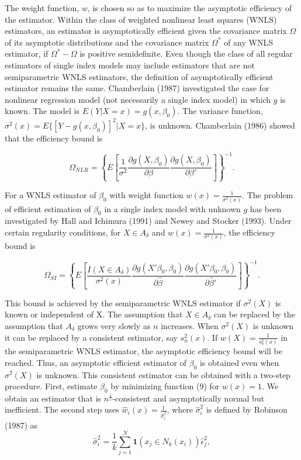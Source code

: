 \documentclass[a4paper]{article}
\begin{document}
The weight function, $w$, is chosen so as to maximize the asymptotic efficiency of the estimator. Within the class of weighted nonlinear least squares (WNLS) estimators, an estimator is asymptotically efficient given the covariance matrix $\Omega$ of its asymptotic distributions and the covariance matrix $\Omega^*$ of any WNLS estimator, if $\Omega^* - \Omega$ is positive semidefinite. Even though the class of all regular estimators of single index models may include estimators that are not semiparametric WNLS estimators, the definition of asymptotically efficient estimator remains the same. Chamberlain (1987) investigated the case for nonlinear regression model (not necessarily a single index model) in which $g$ is known. The model is $E(Y|X = x) = g(x, \beta_0)$. The variance function, $\sigma^2(x) = E\{[Y - g(x, \beta_0)]^2| X = x\}$, is unknown. Chamberlain (1986) showed that the efficiency bound is 

\[ \Omega_{NLR} = \left\{E\left[\frac{1}{\sigma^2}\frac{\partial g(X, \beta_0)}{\partial \beta} \frac{\partial g(X, \beta_0)}{\partial \beta'}\right]\right\}^{-1}. \]

For a WNLS estimator of $\beta_0$ with weight function $w(x) = \frac{1}{\sigma^2(x)}$. The problem of efficient estimation of $\beta_0$ in a single index model with unknown $g$ has been investigated by Hall and Ichimura (1991) and Newey and Stocker (1993). Under certain regularity conditions, for $X \in A_{\delta}$ and $w(x) = \frac{1}{\sigma^2(x)}$, the efficiency bound is

\begin{equation}
\Omega_{SI} = \left\{ E\left[\frac{I(X \in A_{\delta})}{\sigma^2(x)}\frac{\partial g(X'\beta_0, \beta_0)}{\partial \hat{\beta}}\frac{\partial g(X'\beta_0, \beta_0)}{\partial \hat{\beta}'}\right] \right\}^{-1}.
\end{equation}

This bound is achieved by the semiparametric WNLS estimator if $\sigma^2(X)$ is known or independent of X. The assumption that $X \in A_{\delta}$ can be replaced by the assumption that $A_{\delta}$ grows very slowly as $n$ increases. When $\sigma^2(X)$ is unknown it can be replaced by a consistent estimator, say $s_{n}^{2}(x)$. If $w(X) = \frac{1}{s_{n}^{2}(x)}$ in the semiparametric WNLS estimator, the asymptotic efficiency bound will be reached. Thus, an asymptotic efficient estimator of $\beta_0$ is obtained even when $\sigma^2(X)$ is unknown. This consistent estimator can be obtained with a two-step procedure. First, estimate $\beta_0$ by minimizing function (9) for $w(x) = 1$. We obtain an estimator that is $n^{\frac{1}{2}}$-consistent and asymptotically normal but inefficient. The second step uses $\hat{w}_i(x) = \frac{1}{\hat{\sigma}_{i}^{2}}$, where  $\hat{\sigma}_{i}^{2}$ is defined by Robinson (1987) as 
\[\hat{\sigma}_{i}^{2} = \frac{1}{k}\sum_{j=1}^{N} \mathbf{1}{(x_j \in N_k(x_i))}\hat{\epsilon}_{j}^{2} ,\]
\end{document}
